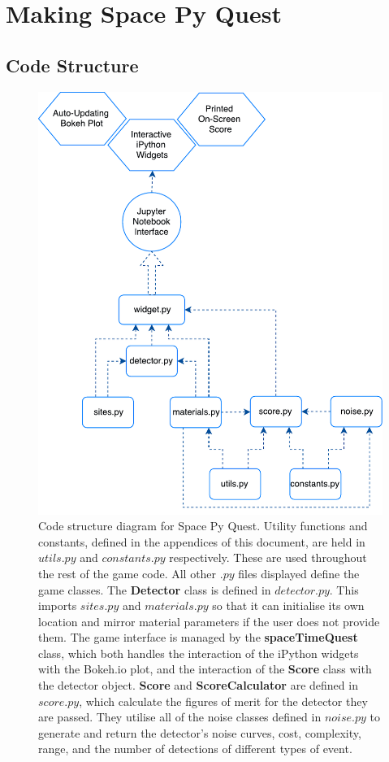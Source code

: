 \documentclass{article}
\begin{document}
\section{Making Space Py Quest}
\label{sec:making}
\subsection{Code Structure}
\label{sec::structure}
\begin{figure}[h!]
    \centering
    \includegraphics[scale=0.75]{SPQstructure.pdf}
    \caption{Code structure diagram for Space Py Quest. Utility
      functions and constants, defined in the appendices of this
      document, are held in $utils.py$ and $constants.py$
      respectively. These are used throughout the rest of the game
      code. All other $.py$ files displayed define the game
      classes. The \textbf{Detector} class is defined in
      $detector.py$. This imports $sites.py$ and $materials.py$ so
      that it can initialise its own location and mirror material
      parameters if the user does not provide them. The game interface
      is managed by the \textbf{spaceTimeQuest} class, which both
      handles the interaction of the iPython widgets with the Bokeh.io
      plot, and the interaction of the \textbf{Score} class with the
      detector object. \textbf{Score} and \textbf{ScoreCalculator} are
      defined in $score.py$, which calculate the figures of merit for
      the detector they are passed. They utilise all of the noise
      classes defined in $noise.py$ to generate and return the
      detector's noise curves, cost, complexity, range, and the number
      of detections of different types of event.}
    \label{fig:spq1}
\end{figure}
\end{document}

